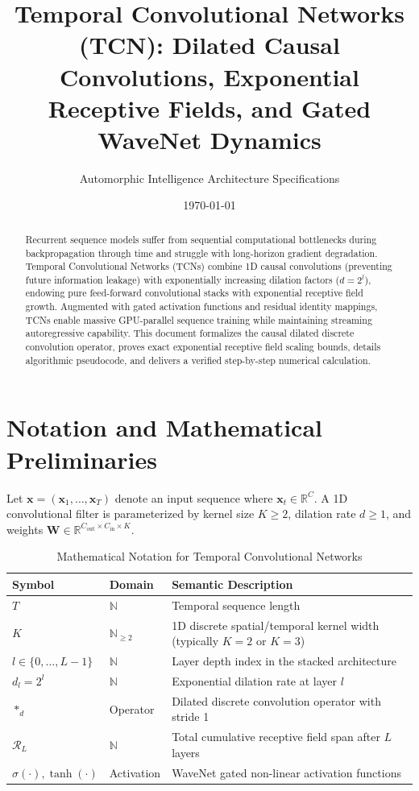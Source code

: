 \documentclass[11pt,a4paper]{article}
\title{Temporal Convolutional Networks (TCN): Dilated Causal Convolutions, Exponential Receptive Fields, and Gated WaveNet Dynamics}
\author{Automorphic Intelligence Architecture Specifications}
\date{\today}
\theoremstyle{definition}
\begin{document}
\maketitle

\begin{abstract}
Recurrent sequence models suffer from sequential computational bottlenecks during backpropagation through time and struggle with long-horizon gradient degradation. Temporal Convolutional Networks (TCNs) combine 1D causal convolutions (preventing future information leakage) with exponentially increasing dilation factors ($d = 2^l$), endowing pure feed-forward convolutional stacks with exponential receptive field growth. Augmented with gated activation functions and residual identity mappings, TCNs enable massive GPU-parallel sequence training while maintaining streaming autoregressive capability. This document formalizes the causal dilated discrete convolution operator, proves exact exponential receptive field scaling bounds, details algorithmic pseudocode, and delivers a verified step-by-step numerical calculation.
\end{abstract}

\section{Notation and Mathematical Preliminaries}

Let $\mathbf{x} = (\mathbf{x}_1, \dots, \mathbf{x}_T)$ denote an input sequence where $\mathbf{x}_t \in \mathbb{R}^C$. A 1D convolutional filter is parameterized by kernel size $K \ge 2$, dilation rate $d \ge 1$, and weights $\mathbf{W} \in \mathbb{R}^{C_{\text{out}} \times C_{\text{in}} \times K}$.

\begin{table}[h]
\centering
\caption{Mathematical Notation for Temporal Convolutional Networks}
\begin{tabular}{lll}
\toprule
\textbf{Symbol} & \textbf{Domain} & \textbf{Semantic Description} \\
\midrule
$T$ & $\mathbb{N}$ & Temporal sequence length \\
$K$ & $\mathbb{N}_{\ge 2}$ & 1D discrete spatial/temporal kernel width (typically $K=2$ or $K=3$) \\
$l \in \{0, \dots, L-1\}$ & $\mathbb{N}$ & Layer depth index in the stacked architecture \\
$d_l = 2^l$ & $\mathbb{N}$ & Exponential dilation rate at layer $l$ \\
$*_{d}$ & Operator & Dilated discrete convolution operator with stride 1 \\
$\mathcal{R}_L$ & $\mathbb{N}$ & Total cumulative receptive field span after $L$ layers \\
$\sigma(\cdot), \tanh(\cdot)$ & Activation & WaveNet gated non-linear activation functions \\
\bottomrule
\end{tabular}
\end{table}
\end{document}
